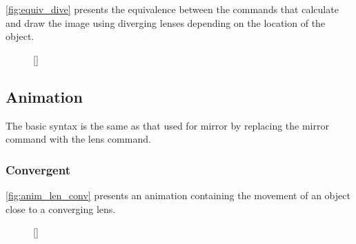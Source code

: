 \documentclass[a4paper,10pt]{article}
\begin{document}
\autoref{fig:equiv_dive} presents the equivalence between the commands that calculate and draw the image using diverging lenses depending on the location of the object.

\begin{figure}[!ht]
  \centering
  \begin{minipage}[c]{0.45\linewidth}
  \end{minipage}%
  \begin{minipage}[c]{0.45\linewidth}
  \end{minipage}
  [\linewidth]{
    \hfill
  }
\end{figure}

\subsection{Animation}

The basic syntax is the same as that used for mirror by replacing the mirror command with the lens command.

\subsubsection{Convergent}

\autoref{fig:anim_len_conv} presents an animation containing the movement of an object close to a converging lens.

\begin{figure}[!ht]
  \centering
  [\linewidth]{
  }
\end{figure}
\end{document}
